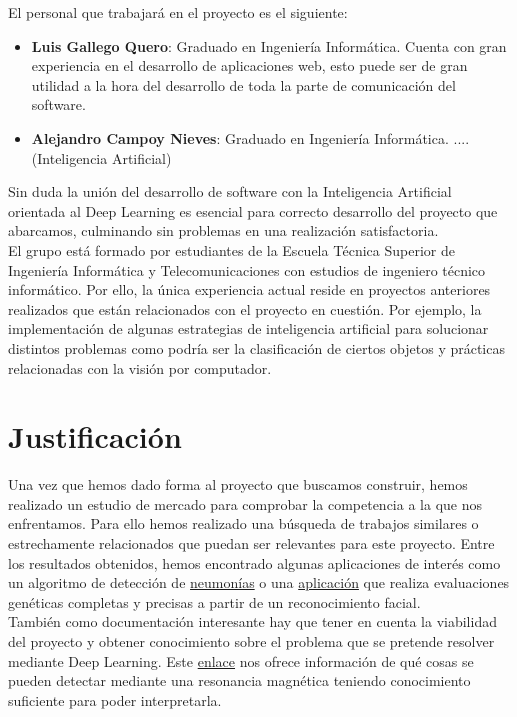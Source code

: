 El personal que trabajará en el proyecto es el siguiente:
\begin{itemize}
	\item \textbf{Luis Gallego Quero}: Graduado en Ingeniería Informática. Cuenta con gran experiencia en el desarrollo de aplicaciones web, esto puede ser de gran utilidad a la hora del desarrollo de toda la parte de comunicación del software.
	\item \textbf{Alejandro Campoy Nieves}:  Graduado en Ingeniería Informática. .... (Inteligencia Artificial)
\end{itemize}

Sin duda la unión del desarrollo de software con la Inteligencia Artificial orientada al Deep Learning es esencial para correcto desarrollo del proyecto que abarcamos, culminando sin problemas en una realización satisfactoria. \\

El grupo está formado por estudiantes de la Escuela Técnica Superior de Ingeniería Informática y Telecomunicaciones con estudios de ingeniero técnico informático. Por ello, la única experiencia actual reside en proyectos anteriores realizados que están relacionados con el proyecto en cuestión. Por ejemplo, la implementación de algunas estrategias de inteligencia artificial para solucionar distintos problemas como podría ser la clasificación de ciertos objetos y prácticas relacionadas con la visión por computador.

\section{Justificación}

Una vez que hemos dado forma al proyecto que buscamos construir, hemos realizado un estudio de mercado para comprobar la competencia a la que nos enfrentamos. Para ello hemos realizado una búsqueda de trabajos similares o estrechamente relacionados que puedan ser relevantes para este proyecto. Entre los resultados obtenidos, hemos encontrado algunas aplicaciones de interés como un algoritmo de detección de \href{https://blogthinkbig.com/este-algoritmo-diagnostica-neumonia-con-la-precision-de-un-medico}{neumonías} o una \href{https://www.face2gene.com/}{aplicación} que realiza evaluaciones genéticas completas y precisas a partir de un reconocimiento facial. \\

También como documentación interesante hay que tener en cuenta la viabilidad del proyecto y obtener conocimiento sobre el problema que se pretende resolver mediante Deep Learning. Este \href{https://blog.hospitalsanangelinn.mx/resonancia-magnetica-diagnostico}{enlace} nos ofrece información de qué cosas se pueden detectar mediante una resonancia magnética teniendo conocimiento suficiente para poder interpretarla. \\

